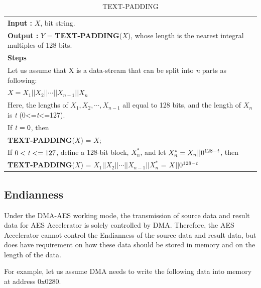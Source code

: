 \documentclass[main\_\_EN.tex]{subfiles}
\begin{document}
\begin{longtable}[c]{|p{15cm}|}
\caption{TEXT-PADDING} 
\label{tab:aes-define-func-text-padding}\\
\hline
\rowcolor{lightgray}
\multirow{1}{*}{%
{\bfseries Function :} {\bfseries TEXT-PADDING}(\ ) } \\\hline
{\bfseries Input\phantom{aaa} :} $X$, bit string.\\
{\bfseries Output\phantom{a~} :} $Y$ = {\bfseries TEXT-PADDING}($X$), whose length is the nearest integral multiples of 128 bits. \\\hline
{\bfseries Steps\phantom{aa~}  }\\
\hspace{1.3cm} Let us assume that X is a data-stream that can be split into {\it{n}} parts as following: \\
\phantom{aaaaaaaa}$X = X_{1} || X_{2} || \cdots || X_{n-1} || X_{n}$ \\ 
\phantom{aaaaaaaa}Here, the lengths of $X_{1}, X_{2}, \cdots, X_{n-1}$ all equal to 128 bits, and the length of $X_{n}$ is {\it{t}} (0<={\it{t}}<=127).\\
\phantom{aaaaaaaa}If ${\it{t}} = 0$, then\\
\phantom{aaaaaaaa}\phantom{空空空空空} {\bfseries TEXT-PADDING}($X$) = $X$;\\
\phantom{aaaaaaaa}If $0<{\it{t}} <= 127$, define a 128-bit block, $X_{n}^{*}$, and let $X_{n}^{*} = X_{n} || 0^{128-{\it{t}}}$, then\\
\phantom{aaaaaaaa}\phantom{空空空空空} {\bfseries TEXT-PADDING}($X$) = $X_{1} || X_{2} || \cdots || X_{n-1} || X_{n}^{*}$  = $X || 0^{128-{\it{t}}}$\\
\hline
\end{longtable}



    
\subsection{Endianness}

Under the DMA-AES working mode, the transmission of source data and result data for AES Accelerator is solely controlled by DMA. Therefore, the AES Accelerator cannot control the Endianness of the source data and result data, but does have requirement on how these data should be stored in memory and on the length of the data.

For example, let us assume DMA needs to write the following data into memory at address 0x0280. 
\end{document}
